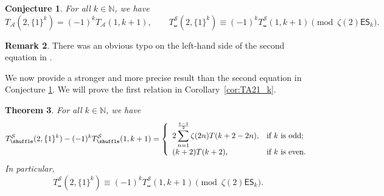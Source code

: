 \documentclass{article}
\newcommand{\ES}{\mathsf {ES}}
\newcommand{\sha}{\shuffle}
\newcommand{\Sy}{{\mathcal S}}
\newcommand{\calA}{\mathcal{A}}
\newcommand{\N}{\mathbb{N}}
\theoremstyle{plain}
\newtheorem{thm}{Theorem}[section]
\newtheorem{conj}[thm]{Conjecture}
\theoremstyle{definition}
\newtheorem{rem}[thm]{Remark}
\begin{document}
\begin{conj}\label{conj:T21k}
For all $k\in\N$, we have
\begin{equation*}
  T_\calA(2,\{1\}^k)=(-1)^{k}  T_\calA(1,k+1), \qquad
  T_\sha^\Sy(2,\{1\}^k)\equiv (-1)^{k} T_\sha^\Sy(1,k+1) \pmod {\zeta(2)\ES_{k}}.
\end{equation*}
\end{conj}

\begin{rem}
There was an obvious typo on the left-hand side of the second equation in \cite[Conj. 2 ]{Zhao2023Dec}.
\end{rem}

We now provide a stronger and more precise result than the second equation in Conjecture \ref{conj:T21k}. We will prove the first relation in Corollary~\ref{cor:TA21_k}.

\begin{thm}\label{thm:SMT21k}
For all $k\in\N$, we have
\begin{equation*}
  T_\sha^\Sy(2,\{1\}^k)-(-1)^{k} T_\sha^\Sy(1,k+1)=
  \left\{
    \begin{array}{ll}
      \displaystyle 2\sum_{n=1}^{\frac{k-1}{2}}\zeta(2n)T(k+2-2n), & \hbox{if $k$ is odd;} \\
      (k+2)T(k+2), \phantom{\frac12} & \hbox{if $k$ is even.}
    \end{array}
  \right.
\end{equation*}
In particular,
\begin{equation*}
  T_\sha^\Sy(2,\{1\}^k)\equiv (-1)^{k} T_\sha^\Sy(1,k+1) \pmod {\zeta(2)\ES_{k}}.
\end{equation*}
\end{thm}
\end{document}
